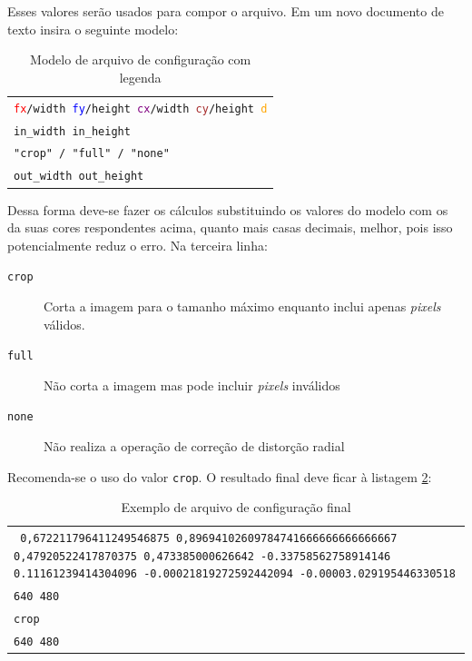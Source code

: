 Esses valores serão usados para compor o arquivo. Em um novo documento de texto insira o seguinte modelo:

\begin{table}[H]\label{tb:7}
\begin{tabular}{| p{\textwidth}|}
\hline
\texttt{\textcolor{red}{fx}/\textcolor{OliveGreen}{width} \textcolor{blue}{fy}/\textcolor{WildStrawberry}{height} \textcolor{purple}{cx}/\textcolor{OliveGreen}{width} \textcolor{brown}{cy}/\textcolor{WildStrawberry}{height} \textcolor{orange}{d}}\\
\texttt{\textcolor{OliveGreen}{in\_width} \textcolor{WildStrawberry}{in\_height}}\\
\texttt{"crop" / "full" / "none"}\\
\texttt{\textcolor{OliveGreen}{out\_width} \textcolor{WildStrawberry}{out\_height}}\\
\hline
\end{tabular}
\caption{Modelo de arquivo de configuração com legenda}
\end{table}

Dessa forma deve-se fazer os cálculos substituindo os valores do modelo com os da suas cores respondentes acima, quanto mais casas decimais, melhor, pois isso potencialmente reduz o erro. Na terceira linha:

\begin{description}
\item[\texttt{crop}]{Corta a imagem para o tamanho máximo enquanto inclui apenas \textit{pixels} válidos.}
\item[\texttt{full}]{Não corta a imagem mas pode incluir \textit{pixels} inválidos}
\item[\texttt{none}]{Não realiza a operação de correção de distorção radial}
\end{description}

Recomenda-se o uso do valor \texttt{crop}. O resultado final deve ficar à listagem \ref{tb:8}:

\begin{table}[H]\label{tb:8}
\begin{tabular}{| p{\textwidth}|}
\hline
\texttt{
0,672211796411249546875 0,89694102609784741666666666666667 0,47920522417870375 0,473385000626642 -0.33758562758914146 0.11161239414304096 -0.00021819272592442094 -0.00003.029195446330518}\\
\texttt{640 480}\\
\texttt{crop}\\
\texttt{640 480}\\
\hline
\end{tabular}
\caption{Exemplo de arquivo de configuração final}
\end{table}

